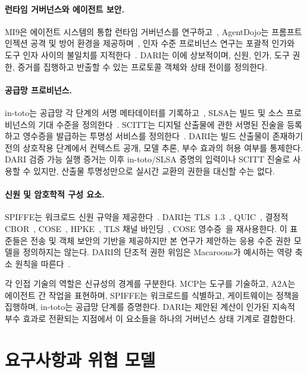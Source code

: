 \documentclass[10pt]{article}
\newcommand{\dariname}{DARI}
\begin{document}
\paragraph{런타임 거버넌스와 에이전트 보안.}
MI9은 에이전트 시스템의 통합 런타임 거버넌스를 연구하고~\cite{wang2025mi9}, AgentDojo는 프롬프트 인젝션 공격 및 방어 환경을 제공하며~\cite{debenedetti2024agentdojo}, 인자 수준 프로비넌스 연구는 포괄적 인가와 도구 인자 사이의 불일치를 지적한다~\cite{fan2026granularity}. \dariname{}는 이에 상보적이며, 신원, 인가, 도구 권한, 증거를 집행하고 반출할 수 있는 프로토콜 객체와 상태 전이를 정의한다.

\paragraph{공급망 프로비넌스.}
in-toto는 공급망 각 단계의 서명 메타데이터를 기록하고~\cite{torresarias2019intoto,intoto}, SLSA는 빌드 및 소스 프로비넌스의 기대 수준을 정의한다~\cite{slsa12}. SCITT는 디지털 산출물에 관한 서명된 진술을 등록하고 영수증을 발급하는 투명성 서비스를 정의한다~\cite{rfc9943}. \dariname{}는 빌드 산출물이 존재하기 전의 상호작용 단계에서 컨텍스트 공개, 모델 추론, 부수 효과의 허용 여부를 통제한다. DARI 검증 가능 실행 증거는 이후 in-toto/SLSA 증명의 입력이나 SCITT 진술로 사용할 수 있지만, 산출물 투명성만으로 실시간 교환의 권한을 대신할 수는 없다.

\paragraph{신원 및 암호학적 구성 요소.}
SPIFFE는 워크로드 신원 규약을 제공한다~\cite{spiffe}. \dariname{}는 TLS~1.3~\cite{rfc9846}, QUIC~\cite{rfc9000}, 결정적 CBOR~\cite{rfc8949}, COSE~\cite{rfc9052}, HPKE~\cite{rfc9180}, TLS 채널 바인딩~\cite{rfc9266}, COSE 영수증~\cite{rfc9942}을 재사용한다. 이 표준들은 전송 및 객체 보안의 기반을 제공하지만 본 연구가 제안하는 응용 수준 권한 모델을 정의하지는 않는다. DARI의 단조적 권한 위임은 Macaroons가 예시하는 역량 축소 원칙을 따른다~\cite{birgisson2014macaroons}.

각 인접 기술의 역할은 신규성의 경계를 구분한다. MCP는 도구를 기술하고, A2A는 에이전트 간 작업을 표현하며, SPIFFE는 워크로드를 식별하고, 게이트웨이는 정책을 집행하며, in-toto는 공급망 단계를 증명한다. DARI는 제안된 계산이 인가된 지속적 부수 효과로 전환되는 지점에서 이 요소들을 하나의 거버넌스 상태 기계로 결합한다.

\section{요구사항과 위협 모델}
\end{document}
